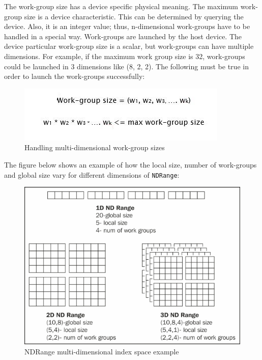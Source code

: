 The work-group size has a device specific physical meaning. The maximum work-group size is a device characteristic. This can be determined by querying the device. Also, it is an integer value; thus, n-dimensional work-groups have to be handled in a special way. Work-groups are launched by the host device. \newline\newline
The device particular work-group size is a scalar, but work-groups can have multiple dimensions. For example, if the maximum work group size is 32, work-groups could be launched in 3 dimensions like (8, 2, 2). The following must be true in order to launch the work-groups successfully: 
\begin{figure}[h!]
\includegraphics[width=\linewidth]{figures/Work-Group_Size.JPG}
\caption{Handling multi-dimensional work-group sizes}
\label{fig:opencl4}
\end{figure} 

The figure below shows an example of how the local size, number of work-groups and global size vary for different dimensions of \verb|NDRange|:
\begin{figure}[h!]
\includegraphics[width=\linewidth]{figures/NDRange_Kernel_Example.jpg}
\caption{NDRange multi-dimensional index space example}
\label{fig:opencl5}
\end{figure}

